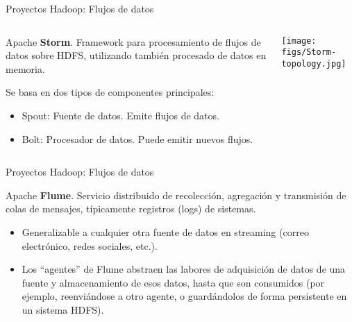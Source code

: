 
\begin{frame}{Proyectos Hadoop: Flujos de datos}
 \begin{columns}[T]
    \begin{column}{.5\textwidth}
     \begin{wideitemize}
      \item Apache \textbf{Storm}. Framework para procesamiento de flujos de
      datos sobre HDFS, utilizando también procesado de datos en memoria.
      \item Se basa en dos tipos de componentes principales:
      \begin{itemize}
       \item Spout: Fuente de datos. Emite flujos de datos.
       \item Bolt: Procesador de datos. Puede emitir nuevos flujos.
      \end{itemize}

    \end{wideitemize}
    \end{column}
    
    \begin{column}{.5\textwidth}
    \vspace*{.7cm}
    \texttt{[image: figs/Storm-topology.jpg]}
    \end{column}
  \end{columns}

\end{frame}


\begin{frame}{Proyectos Hadoop: Flujos de datos}
     \begin{wideitemize}
      \item Apache \textbf{Flume}. Servicio distribuido de recolección, agregación
      y transmisión de colas de mensajes, típicamente registros (logs) de sistemas.
      \begin{itemize}
       \item Generalizable a cualquier otra fuente de datos en streaming (correo
       electrónico, redes sociales, etc.).
       \item Los ``agentes'' de Flume abstraen las labores de adquisición de datos
       de una fuente y almacenamiento de esos datos, hasta que son consumidos (por
       ejemplo, reenviándose a otro agente, o guardándolos de forma persistente en
       un sistema HDFS).
      \end{itemize}

    \end{wideitemize}

\end{frame}

